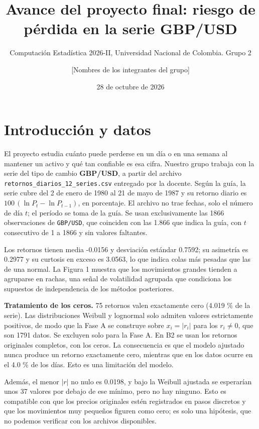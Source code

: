 \documentclass[
  spanish,
]{article}
\title{Avance del proyecto final: riesgo de pérdida en la serie GBP/USD}
\subtitle{Computación Estadística 2026-II, Universidad Nacional de
Colombia. Grupo 2}
\author{{[}Nombres de los integrantes del grupo{]}}
\date{28 de octubre de 2026}
\begin{document}
\maketitle

\section{Introducción y datos}\label{introducciuxf3n-y-datos}

El proyecto estudia cuánto puede perderse en un día o en una semana al
mantener un activo y qué tan confiable es esa cifra. Nuestro grupo
trabaja con la serie del tipo de cambio \textbf{GBP/USD}, a partir del
archivo \texttt{retornos\_diarios\_12\_series.csv} entregado por la
docente. Según la guía, la serie cubre del 2 de enero de 1980 al 21 de
mayo de 1987 y su retorno diario es \(100\,(\ln P_t-\ln P_{t-1})\), en
porcentaje. El archivo no trae fechas, solo el número de día \(t\); el
período se toma de la guía. Se usan exclusivamente las 1866
observaciones de \texttt{GBP/USD}, que coinciden con las 1.866 que
indica la guía, con \(t\) consecutivo de 1 a 1866 y sin valores
faltantes.

Los retornos tienen media -0.0156 y desviación estándar 0.7592; su
asimetría es 0.2977 y su curtosis en exceso es 3.0563, lo que indica
colas más pesadas que las de una normal. La Figura 1 muestra que los
movimientos grandes tienden a agruparse en rachas, una señal de
volatilidad agrupada que condiciona los supuestos de independencia de
los métodos posteriores.

\textbf{Tratamiento de los ceros.} 75 retornos valen exactamente cero
(4.019 \% de la serie). Las distribuciones Weibull y lognormal solo
admiten valores estrictamente positivos, de modo que la Fase A se
construye sobre \(x_i=|r_i|\) para los \(r_i\neq 0\), que son 1791
datos. Se excluyen solo para la Fase A. En B2 se usan los retornos
originales completos, con los ceros. La consecuencia es que el modelo
ajustado nunca produce un retorno exactamente cero, mientras que en los
datos ocurre en el 4.0 \% de los días. Esto es una limitación del
modelo.

Además, el menor \(|r|\) no nulo es 0.0198, y bajo la Weibull ajustada
se esperarían unos 37 valores por debajo de ese mínimo, pero no hay
ninguno. Esto es compatible con que los precios originales estén
registrados en pasos discretos y que los movimientos muy pequeños
figuren como cero; es solo una hipótesis, que no podemos verificar con
los archivos disponibles.
\end{document}
